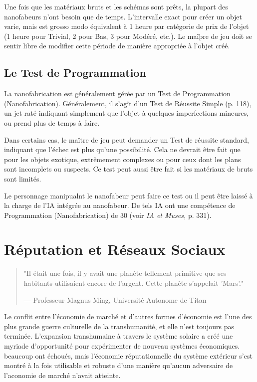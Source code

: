 Une fois que les matériaux bruts et les schémas sont prêts, la plupart des nanofabeurs n'ont besoin que de temps. L'intervalle exact pour créer un objet varie, mais est grosso modo équivalent à 1 heure par catégorie de prix de l'objet (1 heure pour Trivial, 2 pour Bas, 3 pour Modéré, etc.). Le maîþre de jeu doit se sentir libre de modifier cette période de manière appropriée à l'objet créé. 

\subsection{Le Test de Programmation} 

La nanofabrication est généralement gérée par un Test de Programmation (Nanofabrication). Généralement, il s'agît d'un Test de Réussite Simple (p. 118), un jet raté indiquant simplement que l'objet à quelques imperfections mineures, ou prend plus de temps à faire. 

Dans certains cas, le maître de jeu peut demander un Test de réussite standard, indiquant que l'échec est plus qu'une possibilité. Cela ne devrait être fait que pour les objets exotique, extrêmement complexes ou pour ceux dont les plans sont incomplets ou suspects. Ce test peut aussi être fait si les matériaux de bruts sont limités. 

Le personnage manipualnt le nanofabeur peut faire ce test ou il peut être laissé à la charge de l'IA intégrée au nanofabeur. De tels IA ont une compétence de Programmation (Nanofabrication) de 30 (voir \textit{ IA et Muses}\textit{,} p. 331). 

\section{Réputation et Réseaux Sociaux} 

\begin{quote} "Il était une fois, il y avait une planète tellement primitive que ses habitants utilisaient encore de l'argent. Cette planète s'appelait 'Mars'." 

— Professeur Magnus Ming, Université Autonome de Titan \end{quote} 

Le conflit entre l'économie de marché et d'autres formes d'économie est l'une des plus grande guerre culturelle de la transhumanité, et elle n'est toujours pas terminée. L'expansion transhumaine à travers le système solaire a créé une myriade d'opportunité pour expérimenter de nouveau systèmes économiques. beaucoup ont échoués, mais l'économie réputationnelle du système extérieur s'est montré à la fois utilisable et robuste d'une manière qu'aucun adversaire de l'aconomie de marché n'avait atteinte. 

